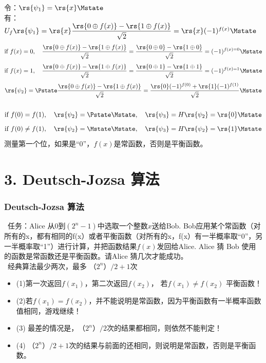 \begin{frame}
    \frametitle{}
     令：$\rs{\psi_1}=\rs{x}\Mstate$ \\
     有：$U_f\rs{\psi_1}=\rs{x}\dfrac{\rs{0\oplus f(x)}-\rs{1\oplus f(x)}}{\sqrt{2}}= \rs{x}(-1)^{f(x)} \Mstate$ \\
     \[\text{if} ~f(x)=0, \quad \frac{\rs{0\oplus f(x)}-\rs{1\oplus f(x)}}{\sqrt{2}}=\frac{\rs{0\oplus 0}-\rs{1\oplus 0}}{\sqrt{2}} = (-1)^{f(x)=0} \Mstate\]
     \[\text{if} ~f(x)=1, \quad \frac{\rs{0\oplus f(x)}-\rs{1\oplus f(x)}}{\sqrt{2}}=\frac{\rs{0\oplus 1}-\rs{1\oplus 1}}{\sqrt{2}} = (-1)^{f(x)=1} \Mstate\]
    \[\rs{\psi_2}= \Pstate \dfrac{\rs{0\oplus f(x)}-\rs{1\oplus f(x)}}{\sqrt{2}}= \dfrac{\rs{0}(-1)^{f(0)}+ \rs{1}(-1)^{f(1)} }{\sqrt{2}} \Mstate\]
\end{frame}

\begin{frame}
    \frametitle{}
     \[\text{if} ~f(0)=f(1), \quad \rs{\psi_2}=\Pstate \Mstate, \quad \rs{\psi_3} =H\rs{\psi_2}=\rs{0}\Mstate \]
     \[\text{if} ~f(0)\neq f(1), \quad\rs{\psi_2}=\Mstate \Mstate,  \quad \rs{\psi_3} =H\rs{\psi_2}=\rs{1}\Mstate \]
    测量第一个位，如果是“0”，$f(x)$是常函数，否则是平衡函数。
\end{frame}

\section{3. Deutsch-Jozsa 算法}
\begin{frame}
    \frametitle{Deutsch-Jozsa 算法}
    {\Bullet}~任务：Alice 从$0$到$(2^n -1)$中选取一个整数$x$送给Bob. Bob应用某个常函数（对所有的x，都有相同的f(x）或者平衡函数（对所有的x，f(x）有一半概率取“0”，另一半概率取“1”）进行计算，并把函数结果$f(x)$发回给Alice.
    Alice 猜 Bob 使用的函数是常函数还是平衡函数。请Alice 猜几次才能成功。 \\ \vspace{0.8em}
    {\Bullet}~经典算法最少两次，最多 $（2^n）/2+1$次
    \begin{itemize}
        \item (1)第一次返回$f(x_1)$，第二次返回$f(x_2)$， 若$f(x_1)\neq f(x_2)$ 平衡函数！
        \item (2)若$f(x_1) = f(x_2)$，并不能说明是常函数，因为平衡函数有一半概率函数值相同，游戏继续！
        \item (3) 最差的情况是，$（2^n）/2$次的结果都相同，则依然不能判定！
        \item (4) $（2^n）/2+1$次的结果与前面的还相同，则说明是常函数，否则是平衡函数。
    \end{itemize}
\end{frame}

